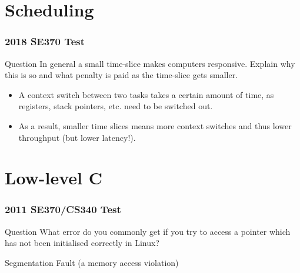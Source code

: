\documentclass{beamer}
\begin{document}
\section{Scheduling}
\begin{frame}
  \frametitle{2018 SE370 Test}
  \begin{block}{Question}
    In general a small time-slice makes computers responsive. Explain why this is so and what penalty is paid as the time-slice gets smaller.
  \end{block}
  \pause
  \begin{itemize}
    \item A context switch between two tasks takes a certain amount of time, as registers, stack pointers, etc. need to be switched out.
    \item As a result, smaller time slices means more context switches and thus lower throughput (but lower latency!).
  \end{itemize}
\end{frame}
\section{Low-level C}
\begin{frame}
  \frametitle{2011 SE370/CS340 Test}
  \begin{block}{Question}
    What error do you commonly get if you try to access a pointer which has not been initialised correctly in Linux?
  \end{block}
  \pause
  Segmentation Fault (a memory access violation)
\end{frame}
\end{document}
